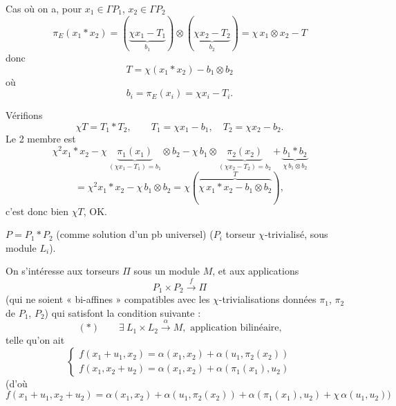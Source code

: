 \documentclass[11pt,a4paper]{article}
\begin{document}
Cas où on a, pour $x_1 \in \Gamma P_1$, $x_2 \in \Gamma P_2$
\[
  \pi_E(x_1 * x_2) = (\underbrace{\chi x_1 - T_1}_{b_1}) \otimes (\underbrace{\chi x_2 - T_2}_{b_2})
  = \chi\, x_1 \otimes x_2 - T
\]
donc
\[
  \boxed{T = \chi(x_1 * x_2) - b_1 \otimes b_2}
\]
où
\[
  b_i = \pi_E(x_i) = \chi x_i - T_i .
\]

Vérifions
\[
  \boxed{\chi T = T_1 * T_2}, \qquad T_1 = \chi x_1 - b_1,\quad T_2 = \chi x_2 - b_2 .
\]
Le 2 membre est
\[
  \chi^2 x_1 * x_2 - \chi\,\underbrace{\pi_1(x_1)}_{(\chi x_1 - T_1) = b_1} \otimes b_2
  - \chi\, b_1 \otimes \underbrace{\pi_2(x_2)}_{(\chi x_2 - T_2) = b_2}
  + \underbrace{b_1 * b_2}_{\chi\, b_1 \otimes b_2}
\]
\[
  = \chi^2 x_1 * x_2 - \chi\, b_1 \otimes b_2
  = \chi(\overbrace{\chi\, x_1 * x_2 - b_1 \otimes b_2}^{T}),
\]
c'est donc bien  $\chi T$, OK.


$P = P_1 * P_2$ (comme solution d'un pb universel) ($P_i$ torseur $\chi$-trivialisé, sous module $L_i$).

On s'intéresse aux torseurs $\Pi$ sous un module $M$, et aux applications
\[
  P_1 \times P_2 \xrightarrow{f} \Pi
\]
(qui ne soient  « bi-affines » compatibles avec les $\chi$-trivialisations données $\pi_1$, $\pi_2$ de $P_1$, $P_2$) qui satisfont la condition suivante :
\[
  (*) \qquad \exists\ L_1 \times L_2 \xrightarrow{\alpha} M, \text{ application bilinéaire,}
\]
telle qu'on ait
\[
  \left\{\begin{array}{l}
  f(x_1 + u_1, x_2) = \alpha(x_1, x_2) + \alpha(u_1, \pi_2(x_2)) \\
  f(x_1, x_2 + u_2) = \alpha(x_1, x_2) + \alpha(\pi_1(x_1), u_2)
  \end{array}\right.
\]
(d'où
\[
  f(x_1 + u_1, x_2 + u_2) = \alpha(x_1, x_2) + \alpha(u_1, \pi_2(x_2)) + \alpha(\pi_1(x_1), u_2)
  + \chi\, \alpha(u_1, u_2)\text{)}
\]
\end{document}
